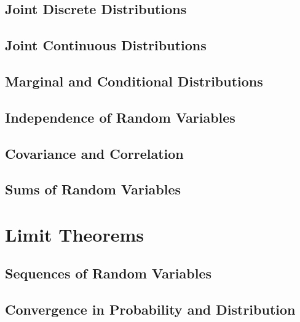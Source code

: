 \documentclass[
  12pt,
]{krantzNoCorner}
\begin{document}
\hypertarget{joint-discrete-distributions}{%
\section{Joint Discrete Distributions}\label{joint-discrete-distributions}}

\hypertarget{joint-continuous-distributions}{%
\section{Joint Continuous Distributions}\label{joint-continuous-distributions}}

\hypertarget{marginal-and-conditional-distributions}{%
\section{Marginal and Conditional Distributions}\label{marginal-and-conditional-distributions}}

\hypertarget{independence-of-random-variables}{%
\section{Independence of Random Variables}\label{independence-of-random-variables}}

\hypertarget{covariance-and-correlation}{%
\section{Covariance and Correlation}\label{covariance-and-correlation}}

\hypertarget{sums-of-random-variables}{%
\section{Sums of Random Variables}\label{sums-of-random-variables}}

\hypertarget{limit-theorems}{%
\chapter{Limit Theorems}\label{limit-theorems}}

\hypertarget{sequences-of-random-variables}{%
\section{Sequences of Random Variables}\label{sequences-of-random-variables}}

\hypertarget{convergence-in-probability-and-distribution}{%
\section{Convergence in Probability and Distribution}\label{convergence-in-probability-and-distribution}}
\end{document}
